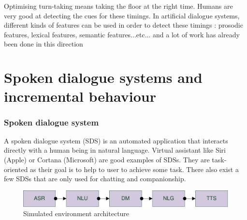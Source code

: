         Optimising turn-taking means taking the floor at the right time. Humans are very good at detecting the cues for these timings. In artificial dialogue systems, different kinds of features can be used in order to detect these timings \cite{Gravano2011}: prosodic features, lexical features, semantic features...etc... and a lot of work has already been done in this direction \cite{Meena2013} 
        
    
\section{Spoken dialogue systems and incremental behaviour}
    
    	\subsubsection{Spoken dialogue system}
        \label{soa:sds}
        
        	A spoken dialogue system (SDS) is an automated application that interacts directly with a human being in natural language. Virtual assistant like Siri (Apple) or Cortana (Microsoft) are good examples of SDSs. They are task-oriented as their goal is to help to user to achieve some task. There also exist a few SDSs that are only used for chatting and companionship.
            
            \begin{figure}[ht]
		      	\centering
      			\includegraphics[scale=0.8]{stateofart/DialogueChain.pdf}
	      		\caption{Simulated environment architecture}
      			\label{fig:dialchain}
			\end{figure}
        
